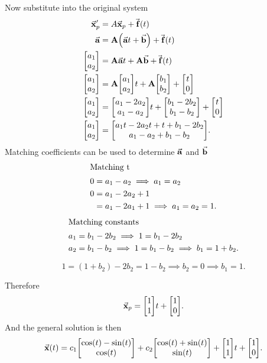 \documentclass[../notes.tex]{subfiles}
\begin{document}
{Now substitute into the original system
\begin{align*}
    \va{x}_p ' &= A\va{x}_p + \va{f}(t) \\
    \va{a} &= \vb{A}\qty(\va{a} t + \va{b}) + \va{f}(t) \\
    \mqty[a_1 \\ a_2] &= \vb{A}\va{a} t + \vb{A}\va{b} + \va{f}(t) \\
    \mqty[a_1 \\ a_2] &= \vb{A}\mqty[a_1 \\ a_2] t + \vb{A}\mqty[b_1 \\ b_2] + \mqty[t \\ 0] \\
    \mqty[a_1 \\ a_2] &= \mqty[a_1 - 2a_2 \\ a_1 - a_2] t + \mqty[b_1 - 2b_2 \\ b_1 - b_2] + \mqty[t \\ 0] \\
    \mqty[a_1 \\ a_2] &= \mqty[a_1 t - 2a_2 t + t + b_1 - 2b_2 \\ a_1 - a_2 + b_1 - b_2]
.\end{align*}
Matching coefficients can be used to determine $\va{a}$ and  $\va{b}$
 \begin{align*}
     \intertext{Matching t}
     0 &= a_1 - a_2 \implies a_1 = a_2 \\
    0 &= a_1 - 2a_2 + 1 \\
    &= a_1 - 2a_1 + 1 \implies a_1 = a_2 = 1
.\end{align*}
 \begin{align*}
     \intertext{Matching constants}
     a_1 &= b_1 - 2b_2 \implies 1 = b_1 - 2b_2 \\
     a_2 &= b_1 - b_2 \implies 1 = b_1 - b_2 \implies b_1 = 1 + b_2 
.\end{align*}

\[
1 = (1+b_2) - 2b_2 = 1 - b_2 \implies b_2 = 0 \implies b_1 = 1
.\] 

Therefore
\[
    \va{x}_p = \mqty[1 \\ 1] t + \mqty[1 \\ 0]
.\] 
And the general solution is then
\[
\va{x}(t) = c_1 \mqty[\cos(t) - \sin(t) \\ \cos(t)] + c_2 \mqty[\cos(t) + \sin(t) \\ \sin(t)] + \mqty[1 \\ 1] t + \mqty[1 \\ 0]
.\] 
}
\end{document}
